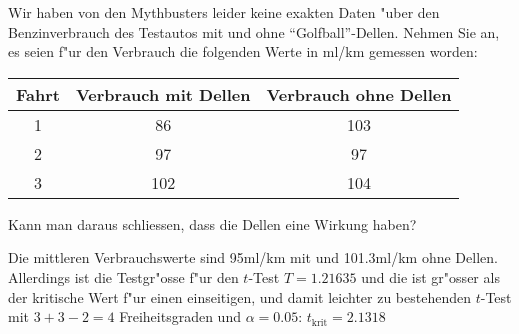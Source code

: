 Wir haben von den Mythbusters leider keine exakten Daten "uber den
Benzinverbrauch des Testautos mit und ohne ``Golfball''-Dellen.
Nehmen Sie an, es seien f"ur den Verbrauch die folgenden Werte in ml/km
gemessen worden:
\begin{center}
\begin{tabular}{ccc}
\hline
Fahrt&Verbrauch mit Dellen&Verbrauch ohne Dellen\\
\hline
1&86&103\\
2&97&97\\
3&102&104\\
\hline
\end{tabular}
\end{center}
Kann man daraus schliessen, dass die Dellen eine Wirkung haben?

\begin{loesung}
Die mittleren Verbrauchswerte sind 95ml/km mit und 101.3ml/km ohne
Dellen. Allerdings ist die Testgr"osse f"ur den $t$-Test
$T=1.21635$ und die ist gr"osser als der kritische Wert f"ur
einen einseitigen, und damit leichter zu bestehenden $t$-Test mit
$3+3-2=4$ Freiheitsgraden und
$\alpha=0.05$: $t_{\text{krit}}=2.1318$
\end{loesung}

